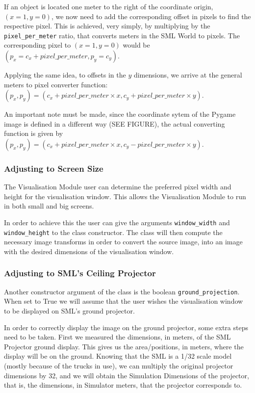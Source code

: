 If an object is located one meter to the right of the coordinate origin, $(x = 1, y = 0)$, we now need to add the corresponding offset in pixels to find the respective pixel. This is achieved, very simply, by multiplying by the \texttt{pixel\_per\_meter} ratio, that converts meters in the SML World to pixels. The corresponding pixel to $(x = 1, y = 0)$ would be $(p_x = c_x + pixel\_per\_meter, p_y = c_y)$.

Applying the same idea, to offsets in the $y$ dimensions, we arrive at the general meters to pixel converter function: $(p_x, p_y) = (c_x + pixel\_per\_meter\times x, c_y + pixel\_per\_meter\times y)$.

An important note must be made, since the coordinate sytem of the Pygame image is defined in a different way (SEE FIGURE), the actual converting function is given by $(p_x, p_y) = (c_x + pixel\_per\_meter\times x, c_y - pixel\_per\_meter\times y)$.


\subsubsection{Adjusting to Screen Size}

The Visualisation Module user can determine the preferred pixel width and height for the visualisation window. This allows the Visualisation Module to run in both small and big screens.

In order to achieve this the user can give the arguments \texttt{window\_width} and \texttt{window\_height} to the class constructor. The class will then compute the necessary image transforms in order to convert the source image, into an image with the desired dimensions of the visualisation window.


\subsubsection{Adjusting to SML's Ceiling Projector}

Another constructor argument of the class is the boolean \texttt{ground\_projection}. When set to True we will assume that the user wishes the visualisation window to be displayed on SML's ground projector.

In order to correctly display the image on the ground projector, some extra steps need to be taken. First we measured the dimensions, in meters, of the SML Projector ground display. This gives us the area/positions, in meters, where the display will be on the ground. Knowing that the SML is a 1/32 scale model (mostly because of the trucks in use), we can multiply the original projector dimensions by 32, and we will obtain the Simulation Dimensions of the projector, that is, the dimensions, in Simulator meters, that the projector corresponds to.

